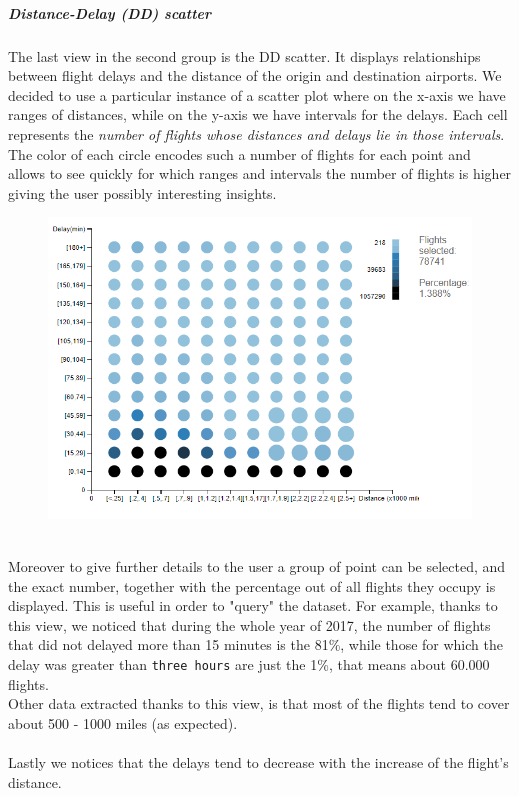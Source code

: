 \documentclass[a4paper, 12pt]{article}
\begin{document}
\subparagraph{Distance-Delay (DD) scatter} 
The last view in the second group is the DD scatter. It displays relationships between flight delays and
the distance of the origin and destination airports.
We decided to use a particular instance of a scatter plot where on the x-axis we have ranges of 
distances, while on the y-axis we have intervals for the delays. Each cell represents the 
\textit{number of flights whose distances and delays lie in those intervals}.
The color of each circle encodes such a number of flights for each point and allows to see quickly
for which ranges and intervals the number of flights is higher giving the user possibly interesting
insights.
\\
\begin{figure}[h]	
\centering
\includegraphics[scale=0.7]{ddscat.PNG}
\end{figure}
\\
Moreover to give further details to the user a group of point can be selected, and the exact number,
together with the percentage out of all flights they occupy is displayed. This is useful in order to
"query" the dataset. For example, thanks to this view, we noticed that during the whole year of 2017,
the number of flights that did not delayed more than 15 minutes is the 81\%, while those for which the
delay was greater than \texttt{three hours} are just the 1\%, that means about 60.000 flights.
\\
Other data extracted thanks to this view, is that most of the flights tend to cover about 500 - 1000
miles (as expected).
\\
\\
Lastly we notices that the delays tend to decrease with the increase of the flight's distance. 
\end{document}
